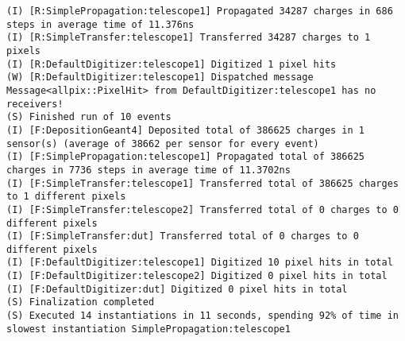 \begin{lstlisting}[breaklines]
(I) [R:SimplePropagation:telescope1] Propagated 34287 charges in 686 steps in average time of 11.376ns
(I) [R:SimpleTransfer:telescope1] Transferred 34287 charges to 1 pixels
(I) [R:DefaultDigitizer:telescope1] Digitized 1 pixel hits
(W) [R:DefaultDigitizer:telescope1] Dispatched message Message<allpix::PixelHit> from DefaultDigitizer:telescope1 has no receivers!
(S) Finished run of 10 events
(I) [F:DepositionGeant4] Deposited total of 386625 charges in 1 sensor(s) (average of 38662 per sensor for every event)
(I) [F:SimplePropagation:telescope1] Propagated total of 386625 charges in 7736 steps in average time of 11.3702ns
(I) [F:SimpleTransfer:telescope1] Transferred total of 386625 charges to 1 different pixels
(I) [F:SimpleTransfer:telescope2] Transferred total of 0 charges to 0 different pixels
(I) [F:SimpleTransfer:dut] Transferred total of 0 charges to 0 different pixels
(I) [F:DefaultDigitizer:telescope1] Digitized 10 pixel hits in total
(I) [F:DefaultDigitizer:telescope2] Digitized 0 pixel hits in total
(I) [F:DefaultDigitizer:dut] Digitized 0 pixel hits in total
(S) Finalization completed
(S) Executed 14 instantiations in 11 seconds, spending 92% of time in slowest instantiation SimplePropagation:telescope1
\end{lstlisting}
